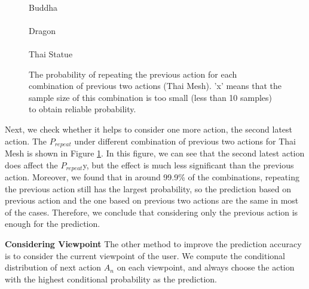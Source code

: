 \begin{figure}
    \centering
    \\
    Buddha\\
    \\
    Dragon\\
    \\
    Thai Statue
    \caption{The probability of repeating the previous action for each combination of previous two actions (Thai Mesh).
    'x' means that the sample size of this combination is too small (less than 10 samples) to obtain reliable probability.}
    \label{f:user:prev2}
\end{figure}
Next, we check whether it helps to consider one more action, the second latest action. 
The $P_{repeat}$ under different combination of
previous two actions for Thai Mesh is shown in Figure \ref{f:user:prev2}.
In this figure, we can see that the second latest action does affect the 
$P_{repeat}$y, but the effect is much less significant than the previous action. 
Moreover, we found that in around 99.9\% of the combinations, 
repeating the previous action still has the largest probability,
so the prediction based on previous action and the one based on previous two actions are the same in
most of the cases. 
Therefore, we conclude that considering only the previous action is enough for the prediction.

\textbf{Considering Viewpoint} 
The other method to improve the prediction accuracy is to consider the current viewpoint of the user.
We compute the conditional distribution of next action $A_n$ on each viewpoint, 
and always choose the action with the highest conditional probability as the prediction.

